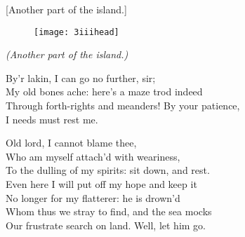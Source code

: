 [Another part of the island.]


\begin{figure}[t]
	\centering
	\texttt{[image: 3iiihead]}
\end{figure}

\vspace{\textsink}
\textit{(Another part of the island.)}\centering



\begin{verse_speech}[Gonzalo] 
By'r lakin, I can go no further, sir;\\
My old bones ache: here's a maze trod indeed\\
Through forth-rights and meanders! By your patience,\\
I needs must rest me.
\end{verse_speech}

\begin{verse_speech}[Alonso] 
Old lord, I cannot blame thee,\\
Who am myself attach'd with weariness,\\
To the dulling of my spirits: sit down, and rest.\\
Even here I will put off my hope and keep it\\
No longer for my flatterer: he is drown'd\\
Whom thus we stray to find, and the sea mocks\\
Our frustrate search on land. Well, let him go.
\end{verse_speech}

\begin{verse_speech}[Antonio] 
\end{verse_speech}

\begin{verse_speech}[Sebastian] 
\end{verse_speech}

